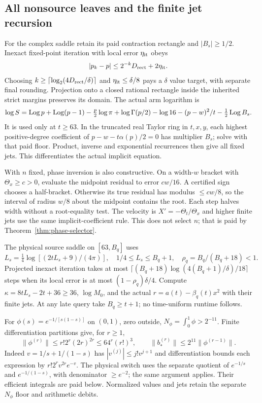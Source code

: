 \subsection{All nonsource leaves and the finite jet recursion}
For the complex saddle retain its paid contraction rectangle and
$|B_s|\ge1/2$. Inexact fixed-point iteration with local error
$\eta_{\rm it}$ obeys
\[
 |p_k-p|\le2^{-k}D_{\rm rect}+2\eta_{\rm it}.
\]
Choosing $k\ge\lceil\log_2(4D_{\rm rect}/\delta)\rceil$ and
$\eta_{\rm it}\le\delta/8$ pays a $\delta$ value target, with
separate final rounding. Projection onto a closed rational rectangle
inside the inherited strict margins preserves its domain. The actual
arm logarithm is
\begin{equation}
 \log S=\operatorname{Log} p+\operatorname{Log}(p-1)-\tfrac p2\log\pi+\log\Gamma(p/2)
       -\log16-(p-w)^2/t-\tfrac12\operatorname{Log} B_s.
 \label{eq:ev-arm-log}
\end{equation}
It is used only at $t\ge63$. In the truncated real Taylor ring in
$t,x,y$, each highest positive-degree coefficient of
$p-w-t\alpha(p)/2=0$ has multiplier $B_s$; solve with that paid
floor. Product, inverse and exponential recurrences then give all
fixed jets. This differentiates the actual implicit equation.

With $n$ fixed, phase inversion is also constructive. On a width-$w$
bracket with $\Theta_x\ge c>0$, evaluate the midpoint residual to
error $cw/16$. A certified sign chooses a half-bracket. Otherwise its
true residual has modulus $\le cw/8$, so the interval of radius
$w/8$ about the midpoint contains the root. Each step halves width
without a root-equality test. The velocity is
$X'=-\Theta_t/\Theta_x$ and higher finite jets use the same
implicit-coefficient rule. This does not select $n$; that is paid by
Theorem~\ref{thm:phase-selector}.

The physical source saddle on $[63,B_q]$ uses
\[
 L_s=\tfrac14\log[(2tL_s+9)/(4\pi)],\quad
 1/4\le L_s\le B_q+1,\quad
 \rho_q=B_q/(B_q+18)<1.
\]
Projected inexact iteration takes at most
$\lceil(B_q+18)\log(4(B_q+1)/\delta)/18\rceil$ steps when its
local error is at most $(1-\rho_q)\delta/4$. Compute
$\kappa=8tL_s-2t+36\ge36$, $\log M_0$, and the actual
$r=a(t)-\beta_q(t)x^2$ with their finite jets. At any late query
take $B_q\ge t+1$; no time-uniform runtime follows.

For $\phi(s)=e^{-1/[s(1-s)]}$ on $(0,1)$, zero outside,
$N_\phi=\int_0^1\phi>2^{-11}$. Finite differentiation partitions
give, for $r\ge1$,
\begin{equation}
 \|\phi^{(r)}\|\le r!2^r(2r)^{2r}\le64^r(r!)^3,
 \qquad\|b_*^{(r)}\|\le2^{11}\|\phi^{(r-1)}\|.
 \label{eq:ev-flat-jets}
\end{equation}
Indeed $v=1/s+1/(1-s)$ has
$|v^{(j)}|\le j!v^{j+1}$ and differentiation bounds each expression
by $r!2^rv^{2r}e^{-v}$. The physical switch uses the separate
quotient of $e^{-1/s}$ and $e^{-1/(1-s)}$, with denominator
$\ge e^{-2}$; the same argument applies. Their efficient integrals
are paid below. Normalized values and jets retain the separate
$N_\phi$ floor and arithmetic debits.

